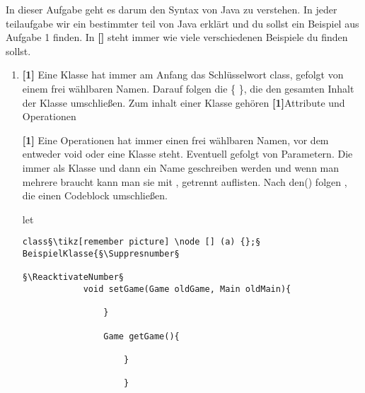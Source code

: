 
In dieser Aufgabe geht es darum den Syntax von Java zu verstehen.
In jeder teilaufgabe wir ein bestimmter teil von Java erklärt und du sollst ein Beispiel aus Aufgabe 1 finden. In \textbf{[]} steht immer wie viele verschiedenen Beispiele du finden sollst.

\begin{enumerate}
    \item \textbf{[1]} Eine Klasse hat immer am Anfang das Schlüsselwort class, gefolgt von einem frei wählbaren Namen. Darauf folgen die \{ \}, die den gesamten Inhalt der Klasse umschließen.
    Zum inhalt einer Klasse gehören \textbf{[1]}Attribute und Operationen

    \textbf{[1]} Eine Operationen hat immer einen frei wählbaren Namen, vor dem entweder void oder eine Klasse steht. Eventuell gefolgt von Parametern. Die immer als Klasse und dann ein Name geschreiben werden und wenn man mehrere braucht kann man sie mit , getrennt auflisten.
    Nach den() folgen {}, die einen Codeblock umschließen.

    let\origthelstnumber\thelstnumber
    \makeatletter
    \newcommand*\Suppressnumber{%
      \lst@AddToHook{OnNewLine}{%
        \let\thelstnumber\relax%
         \advance\c@lstnumber-\@ne\relax%
        }%
    }
    
    \newcommand*\Reactivatenumber{%
      \lst@AddToHook{OnNewLine}{%
       \let\thelstnumber\origthelstnumber%
       \advance\c@lstnumber\@ne\relax}%
    }

    \begin{lstlisting}[title={Beispiel für eine Klasse}]
        class§\tikz[remember picture] \node [] (a) {};§ BeispielKlasse{§\Suppresnumber§
        
§\ReacktivateNumber§
            void setGame(Game oldGame, Main oldMain){
                
                }
                
                Game getGame(){
                    
                    }
                    
                    }
                \end{lstlisting}


\end{enumerate}
